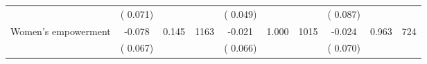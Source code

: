 \begin{tabular}{l*{9}{c}}
                               &        (       0.071) & &                                                                &       (       0.049) & &                                                         &       (       0.087) & & \\ 
 Women's empowerment                &             -0.078        &        0.145 & 1163        &             -0.021 &        1.000 & 1015               &       -0.024 &        0.963 & 724       \\ 
                               &        (       0.067) & &                                                                &       (       0.066) & &                                                         &       (       0.070) & & \\ 
\hline \end{tabular}                                                                                                                                                      
